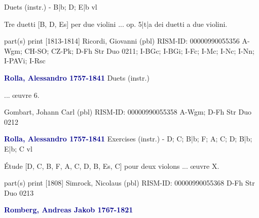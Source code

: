\documentclass[twocolumn]{book}
\begin{document}
\newline Duets (instr.) - B|b; D; E|b
 vl
\newline \begin{itshape}Tre duetti [B, D, Es] per due violini ... op. 5|t|a dei duetti a due violini.\end{itshape} 
\newline \textcolor{darkblue}{}  part(s)
\newline print  [1813-1814]
\newline Ricordi, Giovanni  (pbl)
\newline RISM-ID: 00000990055356
\newline A-Wgm; CH-SO; CZ-Pk; D-Fh  Str Duo 0211; I-BGc; I-BGi; I-Fc; I-Mc; I-Nc; I-Nn; I-PAVi; I-Rsc
\newline \par \vspace{7pt} \textcolor{darkblue}{\textbf{Rolla, Alessandro  1757-1841}}
\newline Duets (instr.)
\newline \begin{itshape}... œuvre 6.\end{itshape} 
\newline Gombart, Johann Carl  (pbl)
\newline RISM-ID: 00000990055358
\newline A-Wgm; D-Fh  Str Duo 0212
\newline \par \vspace{7pt} \textcolor{darkblue}{\textbf{Rolla, Alessandro  1757-1841}}
\newline Exercises (instr.) - D; C; B|b; F; A; C; D; B|b; E|b; C
 vl
\newline \begin{itshape}Étude [D, C, B, F, A, C, D, B, Es, C] pour deux violons ... œuvre X.\end{itshape} 
\newline \textcolor{darkblue}{}  part(s)
\newline print  [1808]
\newline Simrock, Nicolaus  (pbl)
\newline RISM-ID: 00000990055368
\newline D-Fh  Str Duo 0213
\newline \par \vspace{7pt} \textcolor{darkblue}{\textbf{Romberg, Andreas Jakob  1767-1821}}
\end{document}
